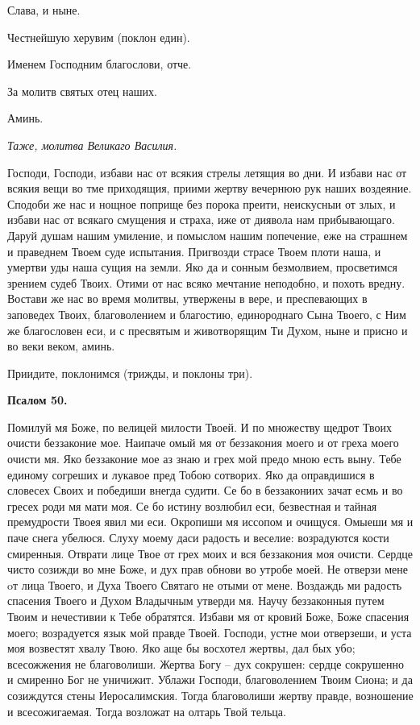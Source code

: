 Слава, и ныне.

Честнейшую херувим (поклон един).

Именем Господним благослови, отче.

За молитв святых отец наших. 

Аминь.


\itshape Таже, молитва Великаго Василия.\normalfont{}

Господи, Господи, избави нас от всякия стрелы летящия во дни. И избави нас от всякия вещи во тме приходящия, приими жертву вечернюю рук наших воздеяние. Сподоби же нас и нощное поприще без порока преити, неискусныи от злых, и избави нас от всякаго смущения и страха, иже от диявола нам прибывающаго. Даруй душам нашим умиление, и помыслом нашим попечение, еже на страшнем и праведнем Твоем суде испытания. Пригвозди страсе Твоем плоти наша, и умертви уды наша сущия на земли. Яко да и сонным безмолвием, просветимся зрением судеб Твоих. Отими от нас всяко мечтание неподобно, и похоть вредну. Востави же нас во время молитвы, утвержены в вере, и преспевающих в заповедех Твоих, благоволением и благостию, единороднаго Сына Твоего, с Ним же благословен еси, и с пресвятым и животворящим Ти Духом, ныне и присно и во веки веком, аминь.

Приидите, поклонимся (трижды, и поклоны три).


\medskip


\bfseries Псалом 50.\normalfont{}


Помилуй мя Боже, по велицей милости Твоей. И по множеству щедрот Твоих очисти беззаконие мое. Наипаче омый мя от беззакония моего и от греха моего очисти мя. Яко беззаконие мое аз знаю и грех мой предо мною есть выну. Тебе единому согреших и лукавое пред Тобою сотворих. Яко да оправдишися в словесех Своих и победиши внегда судити. Се бо в беззакониих зачат есмь и во гресех роди мя мати моя. Се бо истину возлюбил еси, безвестная и тайная премудрости Твоея явил ми еси. Окропиши мя иссопом и очищуся. Омыеши мя и паче снега убелюся. Слуху моему даси радость и веселие: возрадуются кости смиренныя. Отврати лице Твое от грех моих и вся  беззакония моя очисти. Сердце чисто созижди во мне Боже, и дух прав обнови во утробе моей. Не отверзи мене oт лица Твоего, и Духа Твоего Святаго не отыми от мене. Воздаждь ми радость спасения Твоего и Духом Владычным утверди мя. Научу беззаконныя путем Твоим и нечестивии к Тебе обратятся. Избави мя от кровий Боже, Боже спасения моего; возрадуется язык мой правде Твоей. Господи, устне мои отверзеши, и уста моя возвестят хвалу Твою. Яко аще бы восхотел жертвы, дал бых убо; всесожжения не благоволиши. Жертва Богу – дух сокрушен: сердце сокрушенно и смиренно Бог не уничижит. Ублажи Господи, благоволением Твоим Сиона; и да созиждутся стены Иеросалимския. Тогда благоволиши жертву правде, возношение и всесожигаемая. Тогда возложат на олтарь Твой тельца.


